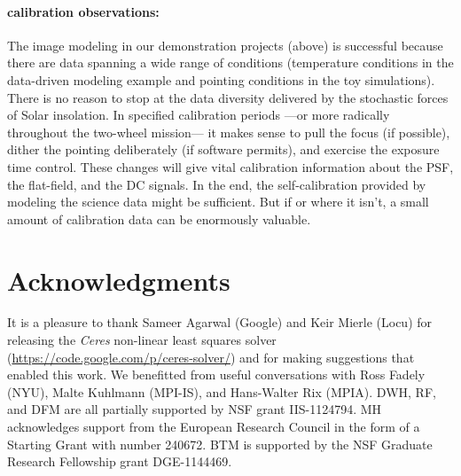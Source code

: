 \documentclass[letterpaper,12pt,whitepaper]{haastex}
\newcommand{\project}[1]{\textsl{#1}}
\begin{document}
\paragraph{calibration observations:}
The image modeling in our demonstration projects (above) is successful
  because there are data spanning a wide range of conditions
  (temperature conditions in the data-driven modeling example
   and pointing conditions in the toy simulations).
There is no reason to stop at the data diversity delivered by the
  stochastic forces of Solar insolation.
In specified calibration periods%
  ---or more radically throughout the two-wheel mission---%
  it makes sense to pull the focus (if possible),
  dither the pointing deliberately (if software permits),
  and exercise the exposure time control.
These changes will give vital calibration information about
  the PSF, the flat-field, and the DC signals.
In the end, the self-calibration provided by modeling the science
  data might be sufficient.
But if or where it isn't, a small amount of calibration data can be enormously valuable.

\section{Acknowledgments}

It is a pleasure to thank Sameer Agarwal (Google) and Keir Mierle
  (Locu) for releasing the \project{Ceres} non-linear least squares
  solver (\url{https://code.google.com/p/ceres-solver/}) and for making
  suggestions that enabled this work.
We benefitted from useful conversations with
  Ross Fadely (NYU),
  Malte Kuhlmann (MPI-IS), and
  Hans-Walter Rix (MPIA).
DWH, RF, and DFM are all partially supported by NSF grant IIS-1124794.
MH acknowledges support from the European Research Council in the form of a Starting Grant with number 240672.
BTM is supported by the NSF Graduate Research Fellowship grant DGE-1144469.
\end{document}
